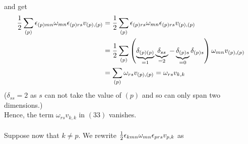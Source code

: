 and get 
\begin{align}
\frac{1}{2}\sum_{(p)}\epsilon_{(p)mn}\omega_{mn}\epsilon_{(p)rs}v_{(p),(p)}&= \frac{1}{2}\sum_{(p)}\epsilon_{(p)rs}\omega_{mn}\epsilon_{(p)rs}v_{(p),(p)}\\
&= \frac{1}{2}\sum_{(p)}\left(\underbrace{\delta_{(p)(p)}}_{=1}\underbrace{\delta_{ss}}_{=2} -\underbrace{\delta_{(p)s}}_{=0}\delta_{(p)s}\right) \omega_{mn}v_{(p),(p)}\\
&= \sum_{(p)}\omega_{rs}v_{(p),(p)} =\omega_{rs}v_{k,k} 
\end{align}
($\delta_{ss}=2$ as $s$ can not take the value of $(p)$ and so can only span two dimensions.)\\
Hence, the term $\omega_{rs}v_{k,k}$ in $(33)$ vanishes.\\\\

Suppose now that $k\ne p$. We rewrite $\frac{1}{2}\epsilon_{kmn}\omega_{mn}\epsilon_{prs}v_{p,k}$ as 

